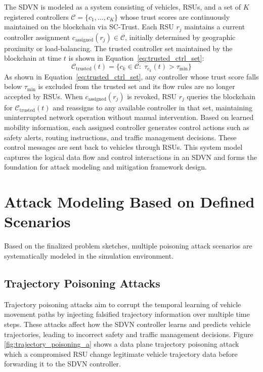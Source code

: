\documentclass[12pt, a4paper]{report}
\begin{document}
The SDVN is modeled as a system consisting of vehicles, RSUs,
and a set of $K$ registered controllers
$\mathcal{C} = \{c_1, \ldots, c_K\}$ whose trust scores are
continuously maintained on the blockchain via SC-Trust.
Each RSU $r_j$ maintains a current controller assignment
$c_{\mathrm{assigned}}(r_j) \in \mathcal{C}$, initially
determined by geographic proximity or load-balancing.
The trusted controller set maintained by the blockchain at time
$t$ is shown in Equation~\ref{eq:trusted_ctrl_set}:
\begin{equation}
  \mathcal{C}_{\mathrm{trusted}}(t) =
    \bigl\{c_k \in \mathcal{C} :\;
    \tau_{c_k}(t) > \tau_{\min}\bigr\}
  \label{eq:trusted_ctrl_set}
\end{equation}
As shown in Equation~\ref{eq:trusted_ctrl_set}, any controller
whose trust score falls below $\tau_{\min}$ is excluded from the
trusted set and its flow rules are no longer accepted by RSUs.
When $c_{\mathrm{assigned}}(r_j)$ is revoked, RSU $r_j$ queries
the blockchain for $\mathcal{C}_{\mathrm{trusted}}(t)$ and
reassigns to any available controller in that set, maintaining
uninterrupted network operation without manual intervention.
Based on learned mobility information, each assigned controller
generates control actions such as safety alerts, routing
instructions, and traffic management decisions. These control
messages are sent back to vehicles through RSUs. This system
model captures the logical data flow and control interactions in
an SDVN and forms the foundation for attack modeling and
mitigation framework design.


\section{Attack Modeling Based on Defined Scenarios}

Based on the finalized problem sketches, multiple poisoning attack scenarios are systematically modeled in the simulation environment.

\subsection{Trajectory Poisoning Attacks}

Trajectory poisoning attacks aim to corrupt the temporal learning of vehicle movement paths by injecting falsified trajectory information over multiple time steps. These attacks affect how the SDVN controller learns and predicts vehicle trajectories, leading to incorrect safety and traffic management decisions.
\newline
\newline
Figure \ref{fig:trajectory_poisoning_a} shows a data plane trajectory poisoning attack which a compromised RSU change legitimate vehicle trajectory data before forwarding it to the SDVN controller.
\end{document}
